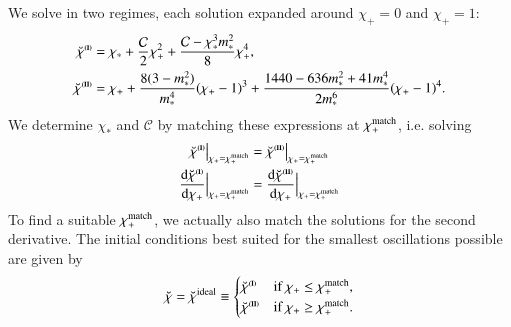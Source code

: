 
We solve in two regimes, each solution expanded around  $\chi_+=0$ and  $\chi_+=1$:
\begin{subequations}
    \begin{align}
        \brchi^{\text{\eqregimenum{I}}}  &= \chi_\ast + \frac{\mathcal{C}}{2}\chi_+^2 + \frac{\mathcal{C}-\chi_\ast^3 m_\ast^2}{8} \chi_+^4 ,\\ %
        \brchi^{\text{\eqregimenum{II}}} &= \chi_+ + \frac{8(3-m_\ast^2)}{m_\ast^4} \pclosed{\chi_+ -1}^3 + \frac{1440 - 636 m_\ast^2 + 41 m_\ast^4}{2 m_\ast^6} \pclosed{\chi_+ -1}^4. %
    \end{align}
\end{subequations}
We determine $\chi_\ast$ and $\mathcal{C}$ by matching these expressions at $\chi_+^\mathrm{match}$, 
i.e. solving
\begin{equation}
    \begin{split}
        \breve{\chi}^{\text{{\tiny{\textbf{(I)}}}}}\big|_{\chi_+=\chi_+^\mathrm{match}} &= \breve{\chi}^{\text{{\tiny{\textbf{(II)}}}}}\big|_{\chi_+=\chi_+^\mathrm{match}} \\
        \dv{\breve{\chi}^{\text{{\tiny{\textbf{(I)}}}}}}{\chi_+}\Big|_{\chi_+=\chi_+^\mathrm{match}} &= \dv{\breve{\chi}^{\text{{\tiny{\textbf{(II)}}}}}}{\chi_+}\Big|_{\chi_+=\chi_+^\mathrm{match}}
    \end{split}
\end{equation}
To find a suitable $\chi_+^\mathrm{match}$, we actually also match the solutions for the second derivative. The initial conditions best suited for the smallest oscillations possible are given by 
\begin{equation}\label{eq:stablesym:optimal_chi_breve}
    \breve{\chi} = \breve{\chi}^\mathrm{ideal}\equiv \begin{cases}
        \breve{\chi}^{\text{{\tiny{\textbf{(I)}}}}} &\text{if } \chi_+ \leq\chi_+^\mathrm{match}, \\
        \breve{\chi}^{\text{{\tiny{\textbf{(II)}}}}} &\text{if } \chi_+ \geq\chi_+^\mathrm{match}.
    \end{cases}
\end{equation}

